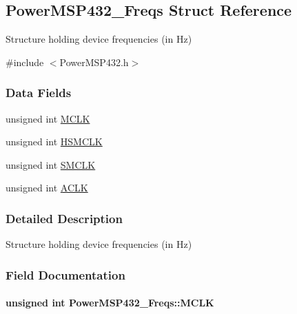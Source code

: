 \subsection{Power\+M\+S\+P432\+\_\+\+Freqs Struct Reference}
\label{struct_power_m_s_p432___freqs}


Structure holding device frequencies (in Hz)  




{\ttfamily \#include $<$Power\+M\+S\+P432.\+h$>$}

\subsubsection*{Data Fields}
\begin{DoxyCompactItemize}
\item 
unsigned int \hyperlink{struct_power_m_s_p432___freqs_ac0d0f8363174dfc6acc8fe5509156a13}{M\+C\+L\+K}
\item 
unsigned int \hyperlink{struct_power_m_s_p432___freqs_ae390f1cabbfb7383e55655457d6ac74a}{H\+S\+M\+C\+L\+K}
\item 
unsigned int \hyperlink{struct_power_m_s_p432___freqs_aacb0ccad74d7029f8678b1b61fa682ed}{S\+M\+C\+L\+K}
\item 
unsigned int \hyperlink{struct_power_m_s_p432___freqs_acb3ced6dd64c0010d6745cd11ae6d166}{A\+C\+L\+K}
\end{DoxyCompactItemize}


\subsubsection{Detailed Description}
Structure holding device frequencies (in Hz) 

\subsubsection{Field Documentation}
\paragraph[{M\+C\+L\+K}]{\setlength{\rightskip}{0pt plus 5cm}unsigned int Power\+M\+S\+P432\+\_\+\+Freqs\+::\+M\+C\+L\+K}\label{struct_power_m_s_p432___freqs_ac0d0f8363174dfc6acc8fe5509156a13}
